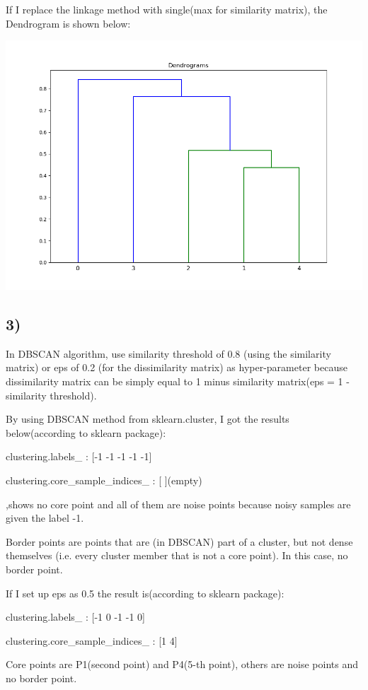 \documentclass{article}
\begin{document}
If I replace the linkage method with single(max for similarity matrix), the Dendrogram is shown below:

\includegraphics[scale=0.4]{Dendrograms_single.png}

\subsection{3)}

In DBSCAN algorithm, use similarity threshold of 0.8 (using the similarity matrix) or eps of 0.2 (for the dissimilarity matrix) as hyper-parameter because dissimilarity matrix can be simply equal to 1 minus similarity matrix(eps = 1 - similarity threshold).

By using DBSCAN method from sklearn.cluster, I got the results below(according to sklearn package):

clustering.labels\_ : [-1 -1 -1 -1 -1]

clustering.core\_sample\_indices\_ : [ ](empty)

,shows no core point and all of them are noise points because noisy samples are given the label -1.

Border points are points that are (in DBSCAN) part of a cluster, but not dense themselves (i.e. every cluster member that is not a core point). In this case, no border point.

If I set up eps as 0.5 the result is(according to sklearn package):

clustering.labels\_ : [-1  0 -1 -1  0]

clustering.core\_sample\_indices\_ : [1 4]

Core points are P1(second point) and P4(5-th point), others are noise points and no border point.
\end{document}

